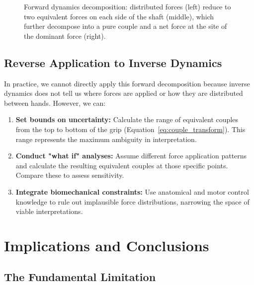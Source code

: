 \documentclass[11pt,a4paper]{article}
\newcommand{\bvec}[1]{\mathbf{#1}}
\begin{document}
\begin{figure}[ht]
\caption{Forward dynamics decomposition: distributed forces (left) reduce to two equivalent forces on each side of the shaft (middle), which further decompose into a pure couple and a net force at the site of the dominant force (right).}
\label{fig:forward_decomposition}
\end{figure}

\subsection{Reverse Application to Inverse Dynamics}

In practice, we cannot directly apply this forward decomposition because inverse dynamics does not tell us where forces are applied or how they are distributed between hands. However, we can:

\begin{enumerate}
    \item \textbf{Set bounds on uncertainty:} Calculate the range of equivalent couples from the top to bottom of the grip (Equation~\ref{eq:couple_transform}). This range represents the maximum ambiguity in interpretation.
    
    \item \textbf{Conduct "what if" analyses:} Assume different force application patterns and calculate the resulting equivalent couples at those specific points. Compare these to assess sensitivity.
    
    \item \textbf{Integrate biomechanical constraints:} Use anatomical and motor control knowledge to rule out implausible force distributions, narrowing the space of viable interpretations.
\end{enumerate}

\section{Implications and Conclusions}

\subsection{The Fundamental Limitation}
\end{document}
